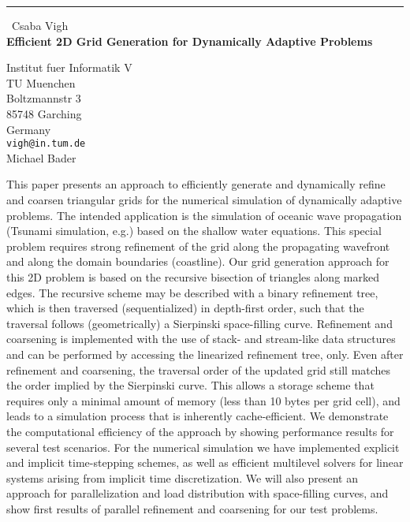 \documentclass{report}
\begin{document}
\begin{center}
\rule{6in}{1pt} \
{\large Csaba Vigh \\
{\bf Efficient 2D Grid Generation for Dynamically Adaptive Problems}}

Institut fuer Informatik V \\ TU Muenchen \\ Boltzmannstr 3 \\ 85748 Garching \\ Germany
\\
{\tt vigh@in.tum.de}\\
Michael Bader\end{center}

This paper presents an approach to efficiently generate and dynamically
refine and coarsen triangular grids for the numerical simulation of
dynamically adaptive problems. The intended application is the simulation
of oceanic wave propagation
(Tsunami simulation, e.g.) based on the shallow water equations. This
special problem requires strong refinement of the grid along the
propagating wavefront and along the domain boundaries (coastline). Our
grid generation approach for this 2D problem is based on the recursive
bisection of triangles along marked edges. The recursive scheme may be
described with a binary refinement tree, which is then traversed
(sequentialized) in depth-first order, such that the traversal follows
(geometrically) a Sierpinski space-filling curve. Refinement and
coarsening is implemented with the use of stack- and stream-like data
structures and can be performed by accessing the linearized refinement
tree, only. Even after refinement and coarsening, the traversal order of
the updated grid still matches the order implied by the Sierpinski curve.
This allows a storage scheme that requires only a minimal amount of
memory (less than 10 bytes per grid cell), and leads to a simulation
process that is inherently cache-efficient. We demonstrate the
computational efficiency of the approach by showing performance results
for several test scenarios. For the numerical simulation we have
implemented explicit and implicit time-stepping schemes, as well as
efficient multilevel solvers for linear systems
arising from implicit time discretization. We will also present an
approach for parallelization and load distribution with space-filling
curves, and show first results of parallel refinement and coarsening for
our test problems.
\end{document}
